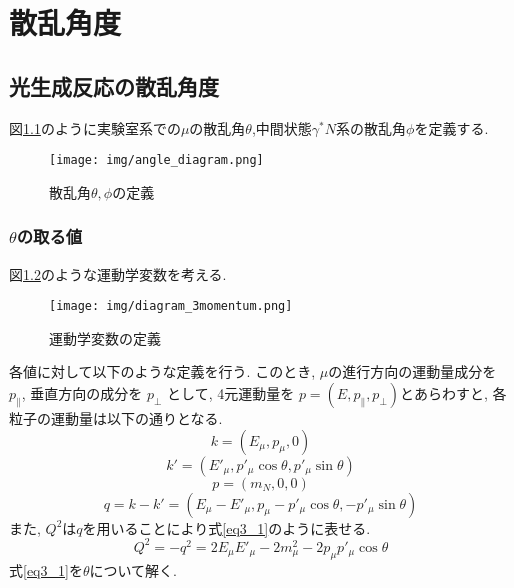\chapter{散乱角度}\label{cha:angle}
\section{光生成反応の散乱角度}
図\ref{fig:angle1}のように実験室系での$\mu$の散乱角$\theta$,中間状態$\gamma^*N$系の散乱角$\phi$を定義する.
\begin{figure}[H]
    \centering
    \texttt{[image: img/angle\_diagram.png]}
    \caption{散乱角$\theta, \phi$の定義}
    \label{fig:angle1}
\end{figure}

\subsection{$\theta$の取る値}
図\ref{fig:angle2}のような運動学変数を考える.\cite{pinkbook}
\begin{figure}[H]
    \centering
    \texttt{[image: img/diagram\_3momentum.png]}
    \caption{運動学変数の定義}
    \label{fig:angle2}
\end{figure}
各値に対して以下のような定義を行う.
このとき, $\mu$の進行方向の運動量成分を
$p_\parallel$, 垂直方向の成分を $p_\perp$ として, 4元運動量を
$p = (E, p_\parallel, p_\perp) $とあらわすと, 各粒子の運動量は以下の通りとなる.
\begin{equation}
    k = (E_\mu , p_\mu,0)
\end{equation}
\begin{equation}
    k' = (E'_\mu, p'_\mu \cos\theta, p'_\mu \sin\theta)
\end{equation}
\begin{equation}
    p = (m_N, 0, 0)
\end{equation}
\begin{equation}
    q = k-k'=(E_\mu - E'_\mu, p_\mu-p'_\mu \cos\theta, -p'_\mu \sin\theta)
\end{equation}
また, $Q^2$は$q$を用いることにより式\ref{eq3_1}のように表せる.
\begin{equation}
    \label{eq3_1}
    Q^2 = -q^2 = 2E_\mu E'_\mu -2m^2_\mu-2p_\mu p'_\mu \cos\theta
\end{equation}
式\ref{eq3_1}を$\theta$について解く.

